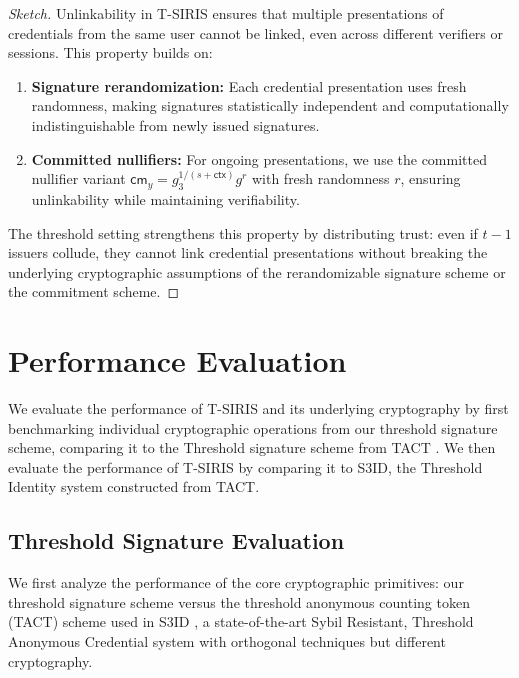\begin{proof}[Sketch]
Unlinkability in T-SIRIS ensures that multiple presentations of credentials from the same user cannot be linked, even across different verifiers or sessions. This property builds on:

\begin{enumerate}
    \item \textbf{Signature rerandomization:} Each credential presentation uses fresh randomness, making signatures statistically independent and computationally indistinguishable from newly issued signatures.
    
    \item \textbf{Committed nullifiers:} For ongoing presentations, we use the committed nullifier variant $\mathsf{cm}_y = g_3^{1/(s + \mathsf{ctx})} g^r$ with fresh randomness $r$, ensuring unlinkability while maintaining verifiability.
\end{enumerate}

The threshold setting strengthens this property by distributing trust: even if $t-1$ issuers collude, they cannot link credential presentations without breaking the underlying cryptographic assumptions of the rerandomizable signature scheme or the commitment scheme.
\end{proof}















\section{Performance Evaluation}\label{chap5:sec_perf_eval}



We evaluate the performance of T-SIRIS and its underlying cryptography by first benchmarking individual cryptographic operations from our threshold signature scheme, comparing it to the Threshold signature scheme from TACT \cite{rabaninejad_attribute-based_2024}. We then evaluate the performance of T-SIRIS by comparing it to S3ID, the Threshold Identity system constructed from TACT.

\subsection{Threshold Signature Evaluation}
We first analyze the performance of the core cryptographic primitives: our threshold signature scheme versus the threshold anonymous counting token (TACT) scheme used in S3ID \cite{rabaninejad_attribute-based_2024}, a state-of-the-art Sybil Resistant, Threshold Anonymous Credential system with orthogonal techniques but different cryptography.

